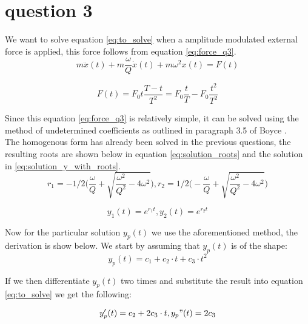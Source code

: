 \section{question 3}
We want to solve equation \ref{eq:to_solve} when a amplitude modulated external force is applied, this force follows from equation \ref{eq:force_q3}.\\

\begin{equation}
    m \ddot{x}(t)+m\frac{\omega}{Q}\dot{x}(t)+m \omega^2 x(t) = F(t)
    \label{eq:to_solve}
\end{equation}

\begin{equation}
    F(t) = F_0 t\frac{T-t}{T^2}= F_0 \frac{t}{T} - F_0 \frac{t^2}{T^2}
    \label{eq:force_q3}
\end{equation}

Since this equation \ref{eq:force_q3} is relatively simple, it can be solved using the method of undetermined coefficients as outlined in paragraph 3.5 of Boyce \cite{Boyce}.\\ The homogenous form has already been solved in the previous questions, the resulting roots are shown below in equation \ref{eq:solution_roots} and the solution in \ref{eq:solution_y_with_roots}.\\

\begin{equation}
    r_1 = -1/2 \biggl( \frac{\omega}{Q}+\sqrt{\frac{\omega^2}{Q^2}-4 \omega^2} \biggr), r_2 = 1/2 \biggl( -\frac{\omega}{Q}+\sqrt{\frac{\omega^2}{Q^2}-4 \omega^2} \biggr)
    \label{eq:solution_roots}
\end{equation}

\begin{equation}
    y_1(t) = e^{r_1 t},  y_2(t) = e^{r_2 t}
    \label{eq:solution_y_with_roots}
\end{equation}

Now for the particular solution $y_p(t)$ we use the aforementioned method, the derivation is show below. We start by assuming that $y_p(t)$ is of the shape:\\

\begin{equation*}
    y_p(t) = c_1 + c_2 \cdot t + c_3 \cdot t^2
\end{equation*}

If we then differentiate $y_p(t)$ two times and substitute the result into equation \ref{eq:to_solve} we get the following:

\begin{equation*}
    y_p'(t) = c_2 + 2c_3 \cdot t,    y_p"(t) = 2c_3
\end{equation*}

